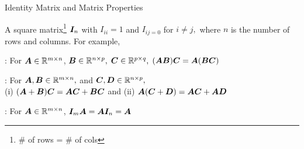 \documentclass[fleqn,aspectratio=169]{beamer}
\begin{document}
\begin{frame}{Identity Matrix and Matrix Properties}

\plitemsep 0.1in

\bci 
\item A square matrix\footnote{\# of rows = \# of cols} $\bm{I}_n$ with $I_{ii} = 1$ and $I_{ij=0}$ for $i \neq j,$ where $n$ is the number of rows and columns. For example, 

\bigskip
\item {}: For $\bm{A} \in {\mathbb R}^{m \times n}$, $\bm{B} \in {\mathbb R}^{n \times p},$ $\bm{C} \in {\mathbb R}^{p \times q},$ $(\bm{AB})\bm{C} = \bm{A}(\bm{BC})$

\item {}: For $\bm{A}, \bm{B} \in {\mathbb R}^{m \times n},$ and $\bm{C}, \bm{D} \in {\mathbb R}^{n \times p},$\\ \hspace{2.2cm}(i) $(\bm{A} + \bm{B})\bm{C} = \bm{AC} + \bm{BC}$ and (ii) $\bm{A}(\bm{C} + \bm{D}) = \bm{AC} + \bm{AD}$

\item {}: For $\bm{A} \in {\mathbb R}^{m \times n}$, $\bm{I}_m \bm{A} = \bm{A} \bm{I}_n = \bm{A}$

\eci
\end{frame}
\end{document}
